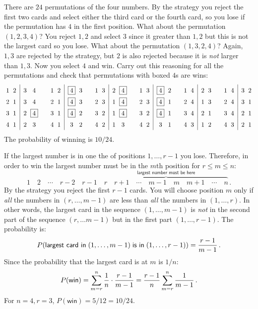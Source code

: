 There are $24$ permutations of the four numbers. By the strategy you reject the first two cards and select either the third card or the fourth card, so you lose if the  permutation has $4$ in the first position. What about the permutation $(1,2,3,4)$? You reject $1,2$ and select $3$ since it  greater than $1,2$ but this is not the largest card so you lose. What about the permutation $(1,3,2,4)$? Again, $1,3$ are rejected by the strategy, but $2$ is also rejected because it is \emph{not} larger than $1,3$. Now you select $4$ and win. Carry out this reasoning for all the permutations and check that permutations with boxed $4$s are wins:
\[
\addtolength{\arraycolsep}{-2pt}
\renewcommand*{\arraystretch}{1.5}
\begin{array}{cc|cc@{\hspace{2em}}cc|cc@{\hspace{2em}}cc|cc@{\hspace{2em}}cc|cc@{\hspace{2em}}cc|cc@{\hspace{2em}}cc|cc}
1&2\;&\;3&4&
1&2\;&\;\fbox{4}&3&
1&3\;&\;2&\fbox{4}&
1&3\;&\;\fbox{4}&2&
1&4\;&\;2&3&
1&4\;&\;3&2\\
2&1\;&\;3&4&
2&1\;&\;\fbox{4}&3&
2&3\;&\;1&\fbox{4}&
2&3\;&\;\fbox{4}&1&
2&4\;&\;1&3&
2&4\;&\;3&1\\
3&1\;&\;2&\fbox{4}&
3&1\;&\;\fbox{4}&2&
3&2\;&\;1&\fbox{4}&
3&2\;&\;\fbox{4}&1&
3&4\;&\;2&1&
3&4\;&\;2&1\\
4&1\;&\;2&3&
4&1\;&\;3&2&
4&2\;&\;1&3&
4&2\;&\;3&1&
4&3\;&\;1&2&
4&3\;&\;2&1
\end{array}
\]
The probability of winning is $10/24$.

 If the largest number is in one the of positions $1,\ldots,r-1$ you lose. Therefore, in order to win the largest number must be in the $m$th position for $r\leq m\leq n$:
\[
1\quad 2\quad \cdots\quad r-2 \quad r-1 \quad \overbrace{r \quad r+1 \quad \cdots\quad m-1\quad  m \quad m+1\quad \cdots \quad n}^{\textsf{largest number must be here}}\,.
\]
By the strategy you reject the first $r-1$ cards. You will choose position $m$ only if \emph{all} the numbers in $(r,\ldots,m-1)$ are less than \emph{all} the numbers in $(1,\ldots,r)$. In other words, the largest card in the sequence $(1,\ldots,m-1)$ is \emph{not} in the second part of the sequence $(r,\ldots m-1)$ but in the first part $(1,\ldots,r-1)$. The probability is:
\[
P(\textsf{largest card in}\;(1,\ldots,m-1)\;\textsf{is in}\; (1,\ldots,r-1)) = \displaystyle\frac{r-1}{m-1}\,.
\]
Since the probability that the largest card is at $m$ is $1/n$:
\begin{equation}\label{eq.dowry1}
P(\textsf{win}) = \sum_{m=r}^{n} \displaystyle\frac{1}{n} \cdot \displaystyle\frac{r-1}{m-1}= \displaystyle\frac{r-1}{n}\sum_{m=r}^{n} \displaystyle\frac{1}{m-1}\,.
\end{equation}
For $n=4, r=3$, $P(\textsf{win}) = 5/12=10/24$.


